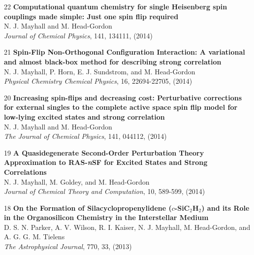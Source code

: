 \documentclass[10pt]{article}
\newenvironment{lonelist}[1][\enskip\textbullet]%
        {\vspace{-\baselineskip}\begin{list}{#1}{%
        \setlength{\partopsep}{0pt}%
        \setlength{\topsep}{0pt}}}
        {\end{list}\vspace{-.6\baselineskip}}
\def\Vhrulefill{\leavevmode\leaders\hrule height 0.7ex depth \dimexpr0.4pt-0.7ex\hfill\kern0pt}
\begin{document}
\begin{lonelist}
\item[22\hspace{4pt}] \textbf{Computational quantum chemistry for single Heisenberg spin couplings made simple: Just one spin flip required}\\
N. J. Mayhall and M. Head-Gordon\\
\textsl{Journal of Chemical Physics}, 141, 134111, (2014)



%
\item[21\hspace{4pt}] \textbf{Spin-Flip Non-Orthogonal Configuration Interaction: A variational and almost black-box method for describing strong correlation}\\
N. J. Mayhall, P. Horn, E. J. Sundstrom, and M. Head-Gordon\\
\textsl{Physical Chemistry Chemical Physics}, 16, 22694-22705, (2014)


\item[20\hspace{4pt}] \textbf{Increasing spin-flips and decreasing cost: Perturbative corrections for external singles to the complete
		active space spin flip model for low-lying excited states and strong correlation}\\
N. J. Mayhall and M. Head-Gordon\\
\textsl{The Journal of Chemical Physics}, 141, 044112, (2014)

\item[19\hspace{4pt}] \textbf{A Quasidegenerate Second-Order Perturbation Theory Approximation to RAS-\textsl{n}SF for Excited States and Strong Correlations}\\
N. J. Mayhall, M. Goldey, and M. Head-Gordon\\
\textsl{Journal of Chemical Theory and Computation}, 10, 589-599, (2014)

\item[18\hspace{4pt}] \textbf{On the Formation of Silacyclopropenylidene ($c$-SiC$_2$H$_2$) and its Role in the Organosilicon Chemistry in the Interstellar Medium}\\
D. S. N. Parker, A. V. Wilson, R. I. Kaiser, N. J. Mayhall, M. Head-Gordon, and A. G. G. M. Tielens\\
\textsl{The Astrophysical Journal}, 770, 33, (2013)


\end{lonelist}
\end{document}
